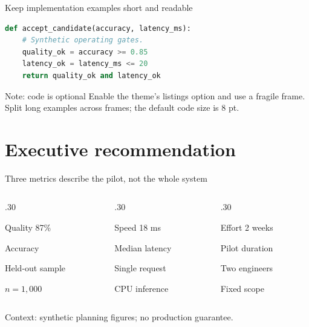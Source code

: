 \documentclass[11pt,aspectratio=169]{beamer}
\begin{document}
\begin{frame}[fragile]{Keep implementation examples short and readable}
  \begin{lstlisting}[language=Python]
def accept_candidate(accuracy, latency_ms):
    # Synthetic operating gates.
    quality_ok = accuracy >= 0.85
    latency_ok = latency_ms <= 20
    return quality_ok and latency_ok
  \end{lstlisting}
  \begin{block}{Note: code is optional}
    Enable the theme's listings option and use a fragile frame.
    Split long examples across frames; the default code size is 8 pt.
  \end{block}
\end{frame}
\section{Executive recommendation}
\begin{frame}{Three metrics describe the pilot, not the whole system}
  \begin{columns}[T,onlytextwidth]
    \begin{column}{.30\textwidth}
      \begin{block}{Quality}
        {\sffamily\Large\textcolor{TempusAccent}{87\%}}\par
        Accuracy\par\small Held-out sample\par $n=1{,}000$
      \end{block}
    \end{column}
    \begin{column}{.30\textwidth}
      \begin{exampleblock}{Speed}
        {\sffamily\Large\textcolor{TempusTeal}{18 ms}}\par
        Median latency\par\small Single request\par CPU inference
      \end{exampleblock}
    \end{column}
    \begin{column}{.30\textwidth}
      \begin{alertblock}{Effort}
        {\sffamily\Large\textcolor{TempusAmber}{2 weeks}}\par
        Pilot duration\par\small Two engineers\par Fixed scope
      \end{alertblock}
    \end{column}
  \end{columns}
  \medskip\small Context: synthetic planning figures; no production guarantee.
\end{frame}
\end{document}

